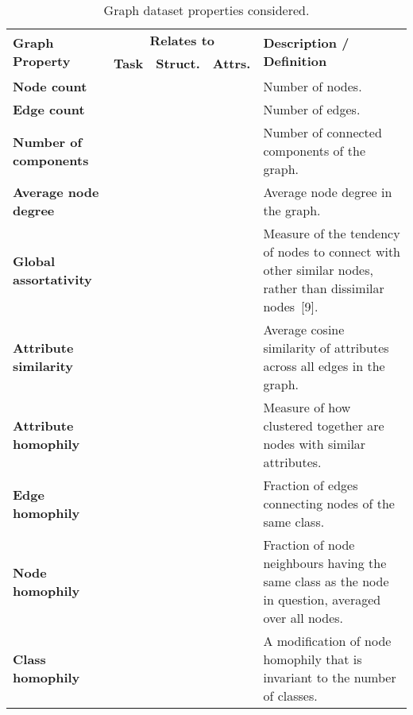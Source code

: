 \begin{table*}[h]
	\caption{Graph dataset properties considered.}
	\label{tab:graph-properties}
	\centering
	\begin{tabularx}{\linewidth}{XcccX}
		\toprule
		\multirow{2}{*}{\textbf{Graph Property}}           & \multicolumn{3}{c}{\textbf{Relates to}}                   & \multirow{2}{*}{\textbf{Description / Definition}} \\
		\cmidrule(lr){2-4}
		                                                   & \textbf{Task} & \textbf{Struct.} & \textbf{Attrs.} & \\
		\midrule
		\textbf{Node count}                                & \crossmark    & \crossmark         & \crossmark          & Number of nodes. \\
		\textbf{Edge count}                                & \crossmark    & \crossmark         & \crossmark          & Number of edges. \\
		\textbf{Number of components}                      & \crossmark    & \checkmark         & \crossmark          & Number of connected components of the graph. \\
		\textbf{Average node degree}                       & \crossmark    & \checkmark         & \crossmark          & Average node degree in the graph. \\
		\textbf{Global assortativity}                      & \crossmark    & \checkmark         & \crossmark          & Measure of the tendency of nodes to connect with other similar nodes, rather than dissimilar nodes~[9]. \\
		\textbf{Attribute similarity}                      & \crossmark    & \checkmark         & \checkmark          & Average cosine similarity of attributes across all edges in the graph. \\
		\textbf{Attribute homophily}                       & \checkmark    & \checkmark         & \crossmark          & Measure of how clustered together are nodes with similar attributes. \\
		\textbf{Edge homophily}                            & \checkmark    & \checkmark         & \crossmark          & Fraction of edges connecting nodes of the same class. \\
		\textbf{Node homophily}                            & \checkmark    & \checkmark         & \crossmark          & Fraction of node neighbours having the same class as the node in question, averaged over all nodes. \\
		\textbf{Class homophily}                           & \checkmark    & \checkmark         & \crossmark          & A modification of node homophily that is invariant to the number of classes. \\

\end{tabularx}
\end{table*}
